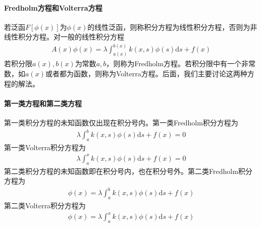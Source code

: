 	\paragraph{Fredholm方程和Volterra方程}
	若泛函$F[\phi(x)]$为$\phi(x)$的线性泛函，则称积分方程为线性积分方程，否则为非线性积分方程。对一般的线性积分方程
	\begin{align*}
		A(x)\phi(x) = \lambda \int_{a(x)}^{b(x)} k(x,s) \phi(s)\mathrm{d}s + f(x)
	\end{align*}
	若积分限$a(x),b(x)$为常数$a,b$，则称为Fredholm方程。若积分限中有一个非常数，如$a(x)$或者都为函数，则称为Volterra方程。后面，我们主要讨论这两种方程的解法。
	\paragraph{第一类方程和第二类方程}
	第一类积分方程的未知函数仅出现在积分号内。第一类Fredholm积分方程为
	\begin{align*}
		\lambda \int_{a}^{b} k(x,s) \phi(s)\mathrm{d}s + f(x) = 0
	\end{align*}
	第一类Volterra积分方程为
	\begin{align*}
		\lambda \int_{a}^{x} k(x,s) \phi(s)\mathrm{d}s + f(x) = 0
	\end{align*}
	第二类积分方程的未知函数即在积分号内，也在积分号外。第二类Fredholm积分方程为
	\begin{align*}
		\phi(x) = \lambda \int_{a}^{b} k(x,s) \phi(s)\mathrm{d}s + f(x)
	\end{align*}
	第二类Volterra积分方程为
	\begin{align*}
		\phi(x) = \lambda \int_{a}^{x} k(x,s) \phi(s)\mathrm{d}s + f(x)
	\end{align*}
